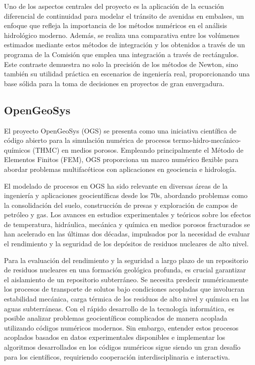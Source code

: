 \documentclass[a4paper]{article}
\begin{document}
    Uno de los aspectos centrales del proyecto es la aplicación de la ecuación diferencial de continuidad para modelar el tránsito de avenidas en embalses, un enfoque que refleja la importancia de los métodos numéricos en el análisis hidrológico moderno. Además, se realiza una comparativa entre los volúmenes estimados mediante estos métodos de integración y los obtenidos a través de un programa de la Comisión que emplea una integración a través de rectángulos. Este contraste demuestra no solo la precisión de los métodos de Newton, sino también su utilidad práctica en escenarios de ingeniería real, proporcionando una base sólida para la toma de decisiones en proyectos de gran envergadura.\cite{newton_method}

    \subsection{OpenGeoSys}
    El proyecto OpenGeoSys (OGS) se presenta como una iniciativa científica de código abierto para la simulación numérica de procesos termo-hidro-mecánico-químicos (THMC) en medios porosos. Empleando principalmente el Método de Elementos Finitos (FEM), OGS proporciona un marco numérico flexible para abordar problemas multifacéticos con aplicaciones en geociencia e hidrología. 

    El modelado de procesos en OGS ha sido relevante en diversas áreas de la ingeniería y aplicaciones geocientíficas desde los 70s, abordando problemas como la consolidación del suelo, construcción de presas y exploración de campos de petróleo y gas. Los avances en estudios experimentales y teóricos sobre los efectos de temperatura, hidráulica, mecánica y química en medios porosos fracturados se han acelerado en las últimas dos décadas, impulsados por la necesidad de evaluar el rendimiento y la seguridad de los depósitos de residuos nucleares de alto nivel.

    Para la evaluación del rendimiento y la seguridad a largo plazo de un repositorio de residuos nucleares en una formación geológica profunda, es crucial garantizar el aislamiento de un repositorio subterráneo. Se necesita predecir numéricamente los procesos de transporte de solutos bajo condiciones acopladas que involucran estabilidad mecánica, carga térmica de los residuos de alto nivel y química en las aguas subterráneas. Con el rápido desarrollo de la tecnología informática, es posible analizar problemas geocientíficos complicados de manera acoplada utilizando códigos numéricos modernos. Sin embargo, entender estos procesos acoplados basados en datos experimentales disponibles e implementar los algoritmos desarrollados en los códigos numéricos sigue siendo un gran desafío para los científicos, requiriendo cooperación interdisciplinaria e interactiva.\cite{geosys}
\end{document}
